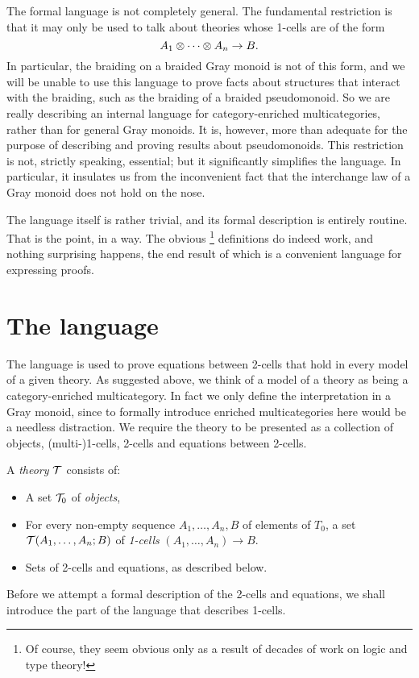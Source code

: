 \documentclass{robinthesisdraft}
\begin{document}
The formal language is not completely general. The fundamental
restriction is that it may only be used to talk about theories
whose 1-cells are of the form
\[
	A_{1}\tn\cdots\tn A_{n} \to B.
\]
In particular, the braiding on a braided Gray monoid is not of this
form, and we will be unable to use this language to prove facts about
structures that interact with the braiding, such as the braiding of
a braided pseudomonoid. So we are really describing an internal
language for category-enriched multicategories, rather than for
general Gray monoids. It is, however, more than adequate for the
purpose of describing and proving results about pseudomonoids.
%
This restriction is not, strictly speaking, essential; but it
significantly simplifies the language. In particular, it
insulates us from the inconvenient fact that the interchange
law of a Gray monoid does not hold on the nose.

The language itself is rather trivial, and its formal description
is entirely routine. That is the point, in a way. The obvious%
\footnote{Of course, they seem obvious only as a result of decades
	of work on logic and type theory!}
definitions do indeed work, and nothing surprising happens,
the end result of which is a convenient language for expressing proofs.

\section{The language}
The language is used to prove equations between 2-cells that hold in
every model of a given theory. As
suggested above, we think of a model of a theory as being a category-enriched
multicategory. 
In fact we only define the interpretation in a Gray monoid, since
to formally introduce enriched multicategories here would be a
needless distraction.
%
We require the theory to be presented as a collection
of objects, (multi-)1-cells, 2-cells and equations between 2-cells.

A \emph{theory} ${\mathcal{T}}$ consists of:
\begin{itemize}
	\item A set ${\mathcal{T}}_{0}$ of \emph{objects},
	\item For every non-empty sequence $A_{1}, \ldots, A_{n}, B$ of
		elements of $T_{0}$,
		a set ${\mathcal{T}}(A_{1},\ldots,A_{n};B)$
		of \emph{1-cells} $(A_{1}, \dots, A_{n})\to B$.
	\item Sets of 2-cells and equations, as described below.
\end{itemize}
Before we attempt a formal description of the 2-cells and equations,
we shall introduce the part of the language that describes 1-cells.
\end{document}
